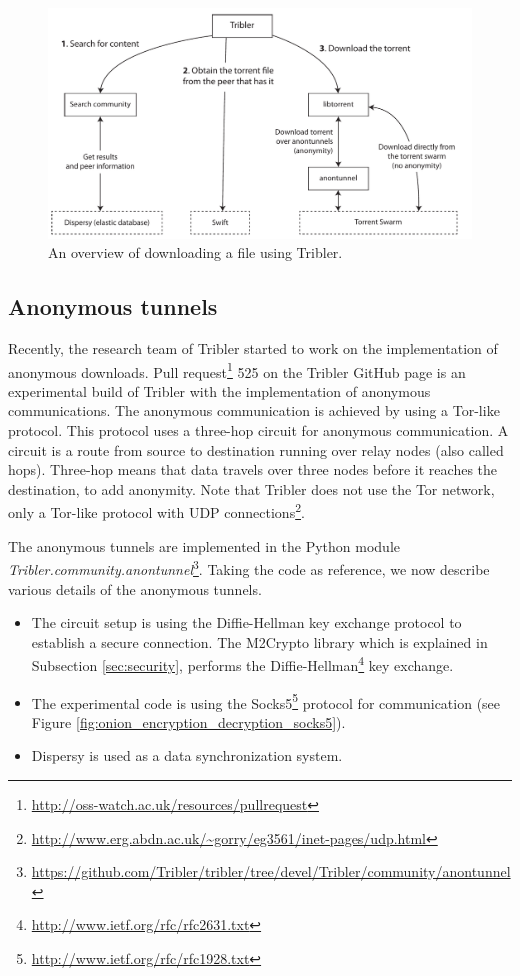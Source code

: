 		\begin{figure}[!htb]
			\centering
			\includegraphics[width=\textwidth]{graphics/tribler-overview.pdf}
			\caption{An overview of downloading a file using Tribler.}
			\label{fig:tribleroverview}
		\end{figure}
	
	\subsection{Anonymous tunnels}
		\label{sec:anonymoustunnels}
			Recently, the research team of Tribler started to work on the implementation of anonymous downloads. Pull request\footnote{\url{http://oss-watch.ac.uk/resources/pullrequest}} 525 on the Tribler GitHub page \cite{pullrequest525} is an experimental build of Tribler with the implementation of anonymous communications. The anonymous communication is achieved by using a Tor-like protocol. This protocol uses a three-hop circuit for anonymous communication. A circuit is a route from source to destination running over relay nodes (also called hops). Three-hop means that data travels over three nodes before it reaches the destination, to add anonymity. Note that Tribler does not use the Tor network, only a Tor-like protocol with UDP connections\footnote{\url{http://www.erg.abdn.ac.uk/~gorry/eg3561/inet-pages/udp.html}}.
			
			The anonymous tunnels are implemented in the Python module \emph{Tribler.community.anontunnel}\footnote{\url{https://github.com/Tribler/tribler/tree/devel/Tribler/community/anontunnel}}. Taking the code as reference, we now describe various details of the anonymous tunnels.
			
			\begin{itemize} 
				\item The circuit setup is using the Diffie-Hellman key exchange protocol to establish a secure connection. The M2Crypto library which is explained in Subsection \ref{sec:security}, performs the Diffie-Hellman\footnote{\url{http://www.ietf.org/rfc/rfc2631.txt}} key exchange.
				\item The experimental code is using the Socks5\footnote{\url{http://www.ietf.org/rfc/rfc1928.txt}} protocol for communication (see Figure \ref{fig:onion_encryption_decryption_socks5}).
				\item Dispersy is used as a data synchronization system. 
			\end{itemize}
			

